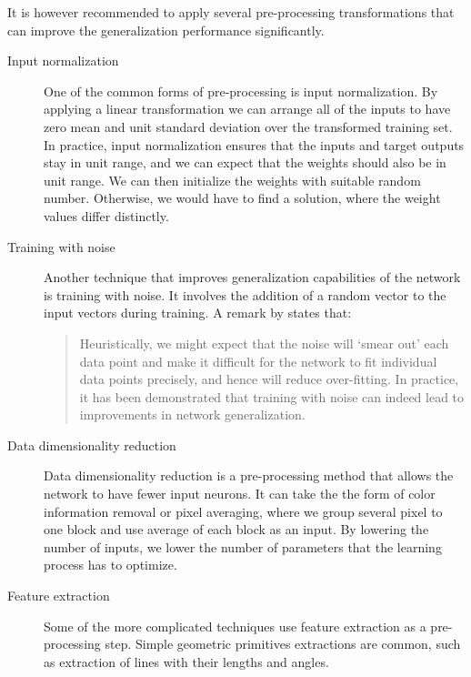 It is however recommended to apply several pre-processing transformations that can improve the generalization performance significantly.
\begin{description}
\item [Input normalization]
One of the common forms of pre-processing is input normalization. By applying a linear transformation we can arrange all of the inputs to have zero mean and unit standard deviation over the transformed training set.
In practice, input normalization ensures that the inputs and target outputs stay in unit range, and we can expect that the weights should also be in unit range. We can then initialize the weights with suitable random number. Otherwise, we would have to find a solution, where the weight values differ distinctly.
\item [Training with noise]
Another technique that improves generalization capabilities of the network is training with noise. It involves the addition of a random vector to the input vectors during training. A remark by \citet{bishop} states that:
\begin{quotation} Heuristically, we might expect that the noise will `smear out' each data point and make it difficult for the network to fit individual data points precisely, and hence will reduce over-fitting. In practice, it has been demonstrated that training with noise can indeed lead to improvements in network generalization.
\end{quotation}
\item [Data dimensionality reduction]
Data dimensionality reduction is a pre-processing method that allows the network to have fewer input neurons. It can take the the form of color information removal or pixel averaging, where we group several pixel to one block and use average of each block as an input. By lowering the number of inputs, we lower the number of parameters that the learning process has to optimize.
\item [Feature extraction]
Some of the more complicated techniques use feature extraction as a pre-processing step. Simple geometric primitives extractions are common, such as extraction of lines with their lengths and angles.
\end{description}

